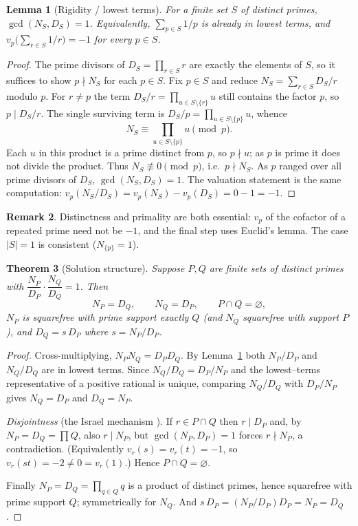 \documentclass[11pt]{article}
\newtheorem{theorem}{Theorem}[section]
\newtheorem{lemma}[theorem]{Lemma}
\theoremstyle{definition}
\newtheorem{remark}[theorem]{Remark}
\begin{document}
\begin{lemma}[Rigidity / lowest terms]\label{thm:rigidity}
For a finite set $S$ of distinct primes, $\gcd(N_S,D_S)=1$. Equivalently, $\sum_{p\in S}1/p$ is
already in lowest terms, and $v_p\!\bigl(\sum_{r\in S}1/r\bigr)=-1$ for every $p\in S$.
\end{lemma}

\begin{proof}
The prime divisors of $D_S=\prod_{r\in S}r$ are exactly the elements of $S$, so it suffices to show
$p\nmid N_S$ for each $p\in S$. Fix $p\in S$ and reduce $N_S=\sum_{r\in S}D_S/r$ modulo $p$. For
$r\ne p$ the term $D_S/r=\prod_{u\in S\setminus\{r\}}u$ still contains the factor $p$, so
$p\mid D_S/r$. The single surviving term is $D_S/p=\prod_{u\in S\setminus\{p\}}u$, whence
\[
N_S \equiv \prod_{u\in S\setminus\{p\}} u \pmod p.
\]
Each $u$ in this product is a prime distinct from $p$, so $p\nmid u$; as $p$ is prime it does not
divide the product. Thus $N_S\not\equiv0\pmod p$, i.e.\ $p\nmid N_S$. As $p$ ranged over all prime
divisors of $D_S$, $\gcd(N_S,D_S)=1$. The valuation statement is the same computation:
$v_p(N_S/D_S)=v_p(N_S)-v_p(D_S)=0-1=-1$.
\end{proof}

\begin{remark}
Distinctness and primality are both essential: $v_p$ of the cofactor of a repeated prime need not be
$-1$, and the final step uses Euclid's lemma. The case $|S|=1$ is consistent ($N_{\{p\}}=1$).
\end{remark}

\begin{theorem}[Solution structure]\label{thm:structure}
Suppose $P,Q$ are finite sets of distinct primes with $\dfrac{N_P}{D_P}\cdot\dfrac{N_Q}{D_Q}=1$.
Then
\[
N_P=D_Q,\qquad N_Q=D_P,\qquad P\cap Q=\varnothing,
\]
$N_P$ is squarefree with prime support exactly $Q$ (and $N_Q$ squarefree with support $P$), and
$D_Q=s\,D_P$ where $s=N_P/D_P$.
\end{theorem}

\begin{proof}
Cross-multiplying, $N_PN_Q=D_PD_Q$. By Lemma~\ref{thm:rigidity} both $N_P/D_P$ and $N_Q/D_Q$ are in
lowest terms. Since $N_Q/D_Q=D_P/N_P$ and the lowest--terms representative of a positive rational is
unique, comparing $N_Q/D_Q$ with $D_P/N_P$ gives $N_Q=D_P$ and $D_Q=N_P$.

\emph{Disjointness} (the Israel mechanism \cite{MO320838}). If $r\in P\cap Q$ then $r\mid D_P$ and,
by $N_P=D_Q=\prod Q$, also $r\mid N_P$, but $\gcd(N_P,D_P)=1$ forces $r\nmid N_P$, a contradiction.
(Equivalently $v_r(s)=v_r(t)=-1$, so $v_r(st)=-2\neq0=v_r(1)$.) Hence $P\cap Q=\varnothing$.

Finally $N_P=D_Q=\prod_{q\in Q}q$ is a product of distinct primes, hence squarefree with prime
support $Q$; symmetrically for $N_Q$. And $s\,D_P=(N_P/D_P)D_P=N_P=D_Q$.
\end{proof}
\end{document}
